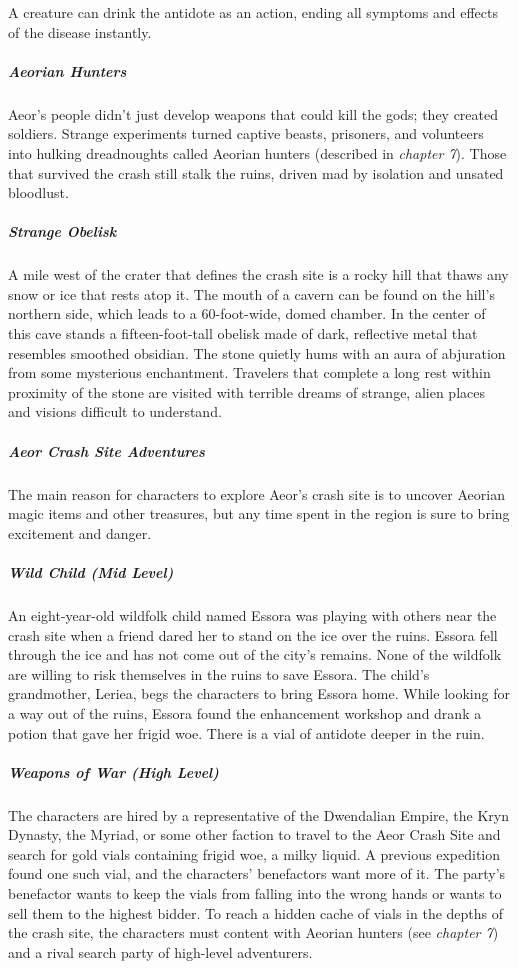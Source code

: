 \documentclass[10pt,a4paper,twoside,bg=print,twocolumn,openany,nodeprecatedcode]{dndbook}
\begin{document}
A creature can drink the antidote as an action, ending all symptoms and effects of the disease instantly.

\subparagraph{Aeorian Hunters}
Aeor's people didn't just develop weapons that could kill the gods; they created soldiers. Strange experiments turned captive beasts, prisoners, and volunteers into hulking dreadnoughts called Aeorian hunters (described in \textit{chapter 7}). Those that survived the crash still stalk the ruins, driven mad by isolation and unsated bloodlust.

\subparagraph{Strange Obelisk}
A mile west of the crater that defines the crash site is a rocky hill that thaws any snow or ice that rests atop it. The mouth of a cavern can be found on the hill's northern side, which leads to a 60-foot-wide, domed chamber. In the center of this cave stands a fifteen-foot-tall obelisk made of dark, reflective metal that resembles smoothed obsidian. The stone quietly hums with an aura of abjuration from some mysterious enchantment. Travelers that complete a long rest within proximity of the stone are visited with terrible dreams of strange, alien places and visions difficult to understand.

\subparagraph{Aeor Crash Site Adventures}
The main reason for characters to explore Aeor's crash site is to uncover Aeorian magic items and other treasures, but any time spent in the region is sure to bring excitement and danger.

\subparagraph{Wild Child (Mid Level)}
An eight-year-old wildfolk child named Essora was playing with others near the crash site when a friend dared her to stand on the ice over the ruins. Essora fell through the ice and has not come out of the city's remains. None of the wildfolk are willing to risk themselves in the ruins to save Essora. The child's grandmother, Leriea, begs the characters to bring Essora home. While looking for a way out of the ruins, Essora found the enhancement workshop and drank a potion that gave her frigid woe. There is a vial of antidote deeper in the ruin.

\subparagraph{Weapons of War (High Level)}
The characters are hired by a representative of the Dwendalian Empire, the Kryn Dynasty, the Myriad, or some other faction to travel to the Aeor Crash Site and search for gold vials containing frigid woe, a milky liquid. A previous expedition found one such vial, and the characters' benefactors want more of it. The party's benefactor wants to keep the vials from falling into the wrong hands or wants to sell them to the highest bidder. To reach a hidden cache of vials in the depths of the crash site, the characters must content with Aeorian hunters (see \textit{chapter 7}) and a rival search party of high-level adventurers.
\end{document}
